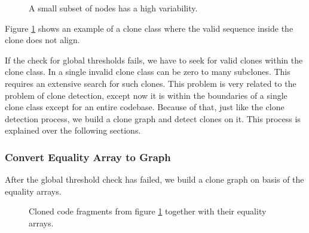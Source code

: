 \begin{figure}[H]
\begin{parcolumns}{3}
\end{parcolumns}
\caption{A small subset of nodes has a high variability.}
\label{fig:2rvariabilityhigh3}
\end{figure}

Figure \ref{fig:2rvariabilityhigh3} shows an example of a clone class where the valid sequence inside the clone does not align.

If the check for global thresholds fails, we have to seek for valid clones within the clone class. In a single invalid clone class can be zero to many subclones. This requires an extensive search for such clones. This problem is very related to the problem of clone detection, except now it is within the boundaries of a single clone class except for an entire codebase. Because of that, just like the clone detection process, we build a clone graph and detect clones on it. This process is explained over the following sections.

\subsubsection{Convert Equality Array to Graph}
After the global threshold check has failed, we build a clone graph on basis of the equality arrays.

\begin{figure}[H]
\begin{parcolumns}{3}
\end{parcolumns}
\caption{Cloned code fragments from figure \ref{fig:2rvariabilityhigh3} together with their equality arrays.}
\label{fig:2rvariabilityhigh4}
\end{figure}

